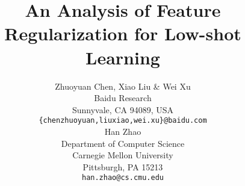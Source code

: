 \documentclass{article} %
\title{An Analysis of Feature Regularization for Low-shot Learning}
\author{Zhuoyuan Chen, Xiao Liu \& Wei Xu\\ %
Baidu Research\\
Sunnyvale, CA 94089, USA \\
\texttt{\{chenzhuoyuan,liuxiao,wei.xu\}@baidu.com} \\
\And
Han Zhao \\
Department of Computer Science \\
Carnegie Mellon University \\
Pittsburgh, PA 15213 \\
\texttt{han.zhao@cs.cmu.edu}  \\
}
\begin{document}
\maketitle







\small


\end{document}
